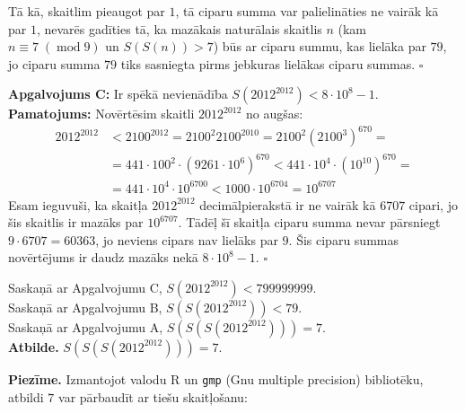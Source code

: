 \documentclass[11pt]{article}
\begin{document}
{Tā kā, skaitlim pieaugot par $1$, tā ciparu summa var palielināties ne vairāk kā par $1$,
nevarēs gadīties tā, ka mazākais naturālais skaitlis $n$
(kam $n \equiv 7\;(\operatorname{mod} 9)$ un $S(S(n)) > 7$)
būs ar ciparu summu, kas lielāka par $79$, jo ciparu summa $79$ tiks sasniegta pirms
jebkuras lielākas ciparu summas. $\square$

{\bf Apgalvojums C:}
Ir spēkā nevienādība $S(2012^{2012}) < 8 \cdot 10^8 - 1$. \\
{\bf Pamatojums:}
Novērtēsim skaitli $2012^{2012}$ no augšas:
\begin{align}
2012^{2012} &< 2100^{2012} = 2100^2 2100^{2010} = 2100^2 (2100^3)^{670} = \nonumber \\
            &= 441 \cdot 100^2 \cdot (9261 \cdot 10^6)^{670} < 441 \cdot 10^4 \cdot (10^{10})^{670} = \nonumber \\
            &= 441 \cdot 10^4 \cdot 10^{6700} < 1000 \cdot 10^{6704} = 10^{6707} \nonumber
\end{align}
Esam ieguvuši, ka skaitļa $2012^{2012}$ decimālpierakstā ir ne vairāk kā $6707$ cipari,
jo šis skaitlis ir mazāks par $10^{6707}$. Tādēļ šī skaitļa ciparu summa
nevar pārsniegt $9 	\cdot 6707 = 60363$, jo neviens cipars nav lielāks par $9$.
Šis ciparu summas novērtējums ir daudz mazāks nekā $8 \cdot 10^8 - 1$. $\square$

Saskaņā ar Apgalvojumu C,
$S(2012^{2012}) < 799999999$.\\
Saskaņā ar Apgalvojumu B, $S(S(2012^{2012})) < 79$.\\
Saskaņā ar Apgalvojumu A, $S(S(S(2012^{2012}))) = 7$.\\
{\bf Atbilde.} $S(S(S(2012^{2012}))) = 7$.

{\bf Piezīme.} Izmantojot valodu R un \texttt{gmp} (Gnu multiple precision) bibliotēku,
atbildi $7$ var pārbaudīt ar tiešu skaitļošanu:

}
\end{document}
